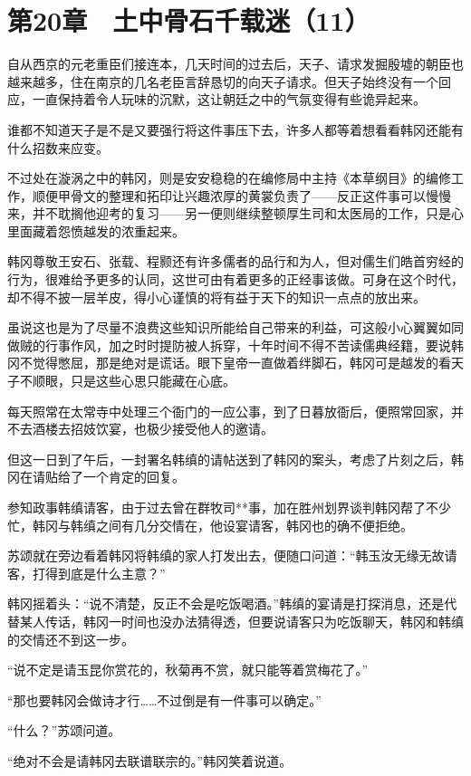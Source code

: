 \section{第20章　土中骨石千载迷（11）}

自从西京的元老重臣们接连本，几天时间的过去后，天子、请求发掘殷墟的朝臣也越来越多，住在南京的几名老臣言辞恳切的向天子请求。但天子始终没有一个回应，一直保持着令人玩味的沉默，这让朝廷之中的气氛变得有些诡异起来。

谁都不知道天子是不是又要强行将这件事压下去，许多人都等着想看看韩冈还能有什么招数来应变。

不过处在漩涡之中的韩冈，则是安安稳稳的在编修局中主持《本草纲目》的编修工作，顺便甲骨文的整理和拓印让兴趣浓厚的黄裳负责了——反正这件事可以慢慢来，并不耽搁他迎考的复习——另一便则继续整顿厚生司和太医局的工作，只是心里面藏着怨愤越发的浓重起来。

韩冈尊敬王安石、张载、程颢还有许多儒者的品行和为人，但对儒生们皓首穷经的行为，很难给予更多的认同，这世可由有着更多的正经事该做。可身在这个时代，却不得不披一层羊皮，得小心谨慎的将有益于天下的知识一点点的放出来。

虽说这也是为了尽量不浪费这些知识所能给自己带来的利益，可这般小心翼翼如同做贼的行事作风，加之时时提防被人拆穿，十年时间不得不苦读儒典经籍，要说韩冈不觉得憋屈，那是绝对是谎话。眼下皇帝一直做着绊脚石，韩冈可是越发的看天子不顺眼，只是这些心思只能藏在心底。 

每天照常在太常寺中处理三个衙门的一应公事，到了日暮放衙后，便照常回家，并不去酒楼去招妓饮宴，也极少接受他人的邀请。

但这一日到了午后，一封署名韩缜的请帖送到了韩冈的案头，考虑了片刻之后，韩冈在请贴给了一个肯定的回复。

参知政事韩缜请客，由于过去曾在群牧司**事，加在胜州划界谈判韩冈帮了不少忙，韩冈与韩缜之间有几分交情在，他设宴请客，韩冈也的确不便拒绝。

苏颂就在旁边看着韩冈将韩缜的家人打发出去，便随口问道：“韩玉汝无缘无故请客，打得到底是什么主意？”

韩冈摇着头：“说不清楚，反正不会是吃饭喝酒。”韩缜的宴请是打探消息，还是代替某人传话，韩冈一时间也没办法猜得透，但要说请客只为吃饭聊天，韩冈和韩缜的交情还不到这一步。

“说不定是请玉昆你赏花的，秋菊再不赏，就只能等着赏梅花了。”

“那也要韩冈会做诗才行……不过倒是有一件事可以确定。”

“什么？”苏颂问道。

“绝对不会是请韩冈去联谱联宗的。”韩冈笑着说道。

